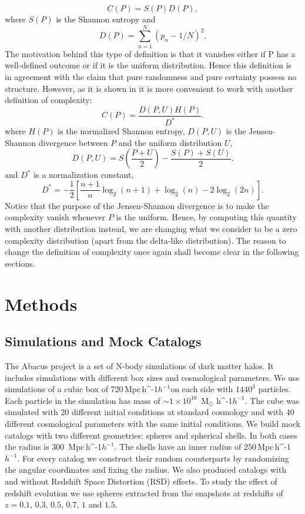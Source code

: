 \documentclass[fleqn,usenatbib]{mnras}
\newcommand{\Msunh}{\,{\rm M}$_{\odot}$\,\,\ifmmode h^{-1}\else $h^{-1}$\fi}
\newcommand{\Mpch}{\,{\rm Mpc}\,\ifmmode h^{-1}\else $h^{-1}$\fi}
\begin{document}
\begin{equation}
	C(P)=S(P)D(P),
\end{equation}
where $S(P)$ is the Shannon entropy and
\begin{equation}
	D(P)=\sum_{n=1}^{N}\left(p_n - 1/N\right)^{2}.
\end{equation}
The motivation behind this type of definition is that it vanishes
either if P has a well-defined outcome or if it is the uniform
distribution.  Hence this definition is in agreement with the claim
that pure randomness and pure certainty possess no structure.  
However, as it is shown in \cite{sig_com} it is more convenient to
work with another definition of complexity: 
\begin{equation}
    C(P)=\frac{D(P,U)H(P)}{D^{*}}.
    \label{eq:comp_def}
\end{equation}
where $H(P)$ is the normalized Shannon entropy, $D(P,U)$ is the
Jensen-Shannon divergence between $P$ and the uniform distribution
$U$, 
\begin{equation}
	D(P,U)=S\left(\frac{P+U}{2}\right) - \frac{S(P)+S(U)}{2}.
\end{equation}
and $D^{*}$ is a normalization constant,
\begin{equation}
    D^{*}=-\frac{1}{2}\left[\frac{n+1}{n}\log_2(n+1)+\log_2(n)-2\log_2(2n)\right].
\end{equation}
Notice that the purpose of the Jensen-Shannon divergence is to make
the complexity vanish whenever $P$ is the uniform. Hence, by computing
this quantity with another distribution instead, we are changing what
we consider to be a zero complexity distribution (apart from the
delta-like distribution). The reason to change the definition of
complexity once again shall become clear in the following sections. 
\section{Methods}


\subsection{Simulations and Mock Catalogs}
The Abacus project \citep{abacus} is a set of N-body simulations of
dark matter halos. It includes simulations with different box sizes
and cosmological parameters. We use simulations of a cubic box of
$720$\Mpch on each side with $1440^3$ particles. Each particle in the
simulation has mass of $\sim1\times10^{10}$ \Msunh. The cube was
simulated with 20 different initial conditions at standard cosmology
and with 40 different cosmological parameters with the same initial
conditions. 
We build mock catalogs with two different geometries: spheres and
spherical shells. In both cases the radius is $300$ \Mpch. The shells
have an inner radius of $250$\Mpch. For every catalog we construct
their random counterparts by randomizing the angular coordinates and
fixing the radius. We also produced catalogs with and without Redshift
Space Distortion (RSD) effects. To study the effect of redshift
evolution we use spheres extracted from the snapshots at redshifts of
$z=0.1$, $0.3$, $0.5$, $0.7$, $1$ and $1.5$. 
\end{document}
